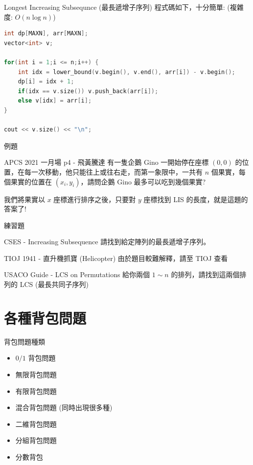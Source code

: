 \documentclass[aspectratio=169]{beamer}
\begin{document}
\begin{frame}[fragile]{Longest Increasing Subsequnce (最長遞增子序列)}
    程式碼如下，十分簡單: (複雜度: $O(n \log n)$)
    \vspace{3mm}
    \begin{lstlisting}[language=C++]
int dp[MAXN], arr[MAXN];
vector<int> v;

for(int i = 1;i <= n;i++) {
    int idx = lower_bound(v.begin(), v.end(), arr[i]) - v.begin();
    dp[i] = idx + 1;
    if(idx == v.size()) v.push_back(arr[i]);
    else v[idx] = arr[i];
}

cout << v.size() << "\n";
    \end{lstlisting}
\end{frame}

\begin{frame}{例題}
    \begin{block}{APCS 2021 一月場 p4 - 飛黃騰達}
        有一隻企鵝 Gino 一開始停在座標 $(0,0)$ 的位置，在每一次移動，他只能往上或往右走，而第一象限中，一共有 $n$ 個果實，每個果實的位置在 $(x_i,y_i)$，請問企鵝 Gino 最多可以吃到幾個果實?
    \end{block} \pause
    我們將果實以 $x$ 座標進行排序之後，只要對 $y$ 座標找到 LIS 的長度，就是這題的答案了!
\end{frame}

\begin{frame}{練習題}
    \begin{block}{CSES - Increasing Subsequence}
        請找到給定陣列的最長遞增子序列。
    \end{block}
    \begin{block}{TIOJ 1941 - 直升機抓寶 (Helicopter)}
        由於題目較難解釋，請至 TIOJ 查看
    \end{block}
    \begin{block}{USACO Guide - LCS on Permutations}
        給你兩個 $1 \sim n$ 的排列，請找到這兩個排列的 LCS (最長共同子序列)
    \end{block}
\end{frame}

\section{各種背包問題}

\begin{frame}{背包問題種類}
    \begin{itemize}
        \item $0/1$ 背包問題
        \item 無限背包問題
        \item 有限背包問題
        \item 混合背包問題 (同時出現很多種)
        \item 二維背包問題
        \item 分組背包問題
        \item 分數背包
    \end{itemize}
\end{frame}
\end{document}
